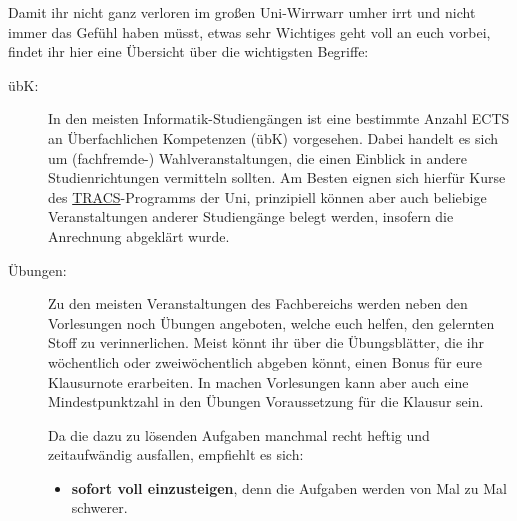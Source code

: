 Damit ihr nicht ganz verloren im gro\ss en Uni-Wirrwarr umher irrt und
  nicht immer das Gefühl haben müsst, etwas sehr Wichtiges geht
  voll an euch vorbei, findet ihr hier eine Übersicht über die wichtigsten Begriffe:

\begin{description}



  
\item [übK:] In den meisten Informatik-Studiengängen ist eine bestimmte Anzahl ECTS an Überfachlichen Kompetenzen (übK) vorgesehen. Dabei handelt es sich um (fachfremde-) Wahlveranstaltungen, die einen Einblick in andere Studienrichtungen vermitteln sollten. Am Besten eignen sich hierfür Kurse des \href{https://uni-tuebingen.de/studium/studienangebot/ueberfachliche-kompetenzen/transdisciplinary-course-program/}{TRACS}-Programms der Uni, prinzipiell können aber auch beliebige Veranstaltungen anderer Studiengänge belegt werden, insofern die Anrechnung abgeklärt wurde.

\item [Übungen:] Zu den meisten Veranstaltungen des Fachbereichs werden neben den Vorlesungen noch Übungen angeboten, welche euch helfen, den gelernten Stoff zu verinnerlichen. Meist könnt ihr über die Übungsblätter, die ihr wöchentlich oder zweiwöchentlich abgeben könnt, einen Bonus für eure Klausurnote erarbeiten. In machen Vorlesungen kann aber auch eine Mindestpunktzahl in den Übungen Voraussetzung für die Klausur sein.

Da die dazu zu lösenden Aufgaben manchmal recht heftig und zeitaufwändig ausfallen, empfiehlt es sich:

\begin{itemize}

\item \textbf{sofort voll einzusteigen}, denn die Aufgaben werden von Mal
  zu Mal schwerer.


\end{itemize}
\end{description}
